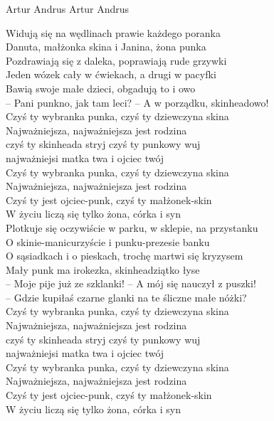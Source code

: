 {Artur Andrus}
{Artur Andrus}
\begin{text}
Widują się na wędlinach prawie każdego poranka\\
Danuta, małżonka skina i Janina, żona punka\\
Pozdrawiają się z daleka, poprawiają rude grzywki\\
Jeden wózek cały w ćwiekach, a drugi w pacyfki\\
Bawią swoje małe dzieci, obgadują to i owo\\
– Pani punkno, jak tam leci? – A w porządku, skinheadowo!\\

Czyś ty wybranka punka, czyś ty dziewczyna skina\\
Najważniejsza, najważniejsza jest rodzina\\
czyś ty skinheada stryj czyś ty punkowy wuj\\
najważniejsi matka twa i ojciec twój\\

Czyś ty wybranka punka, czyś ty dziewczyna skina\\
Najważniejsza, najważniejsza jest rodzina\\
Czyś ty jest ojciec-punk, czyś ty małżonek-skin\\
W życiu liczą się tylko żona, córka i syn\\

Plotkuje się oczywiście w parku, w sklepie, na przystanku\\
O skinie-manicurzyście i punku-prezesie banku\\
O sąsiadkach i o pieskach, trochę martwi się kryzysem\\
Mały punk ma irokezka, skinheadziątko łyse\\
– Moje pije już ze szklanki! – A mój się nauczył z puszki!\\
– Gdzie kupiłaś czarne glanki na te śliczne małe nóżki?\\

Czyś ty wybranka punka, czyś ty dziewczyna skina\\
Najważniejsza, najważniejsza jest rodzina\\
czyś ty skinheada stryj czyś ty punkowy wuj\\
najważniejsi matka twa i ojciec twój\\

Czyś ty wybranka punka, czyś ty dziewczyna skina\\
Najważniejsza, najważniejsza jest rodzina\\
Czyś ty jest ojciec-punk, czyś ty małżonek-skin\\
W życiu liczą się tylko żona, córka i syn\\


\end{text}

